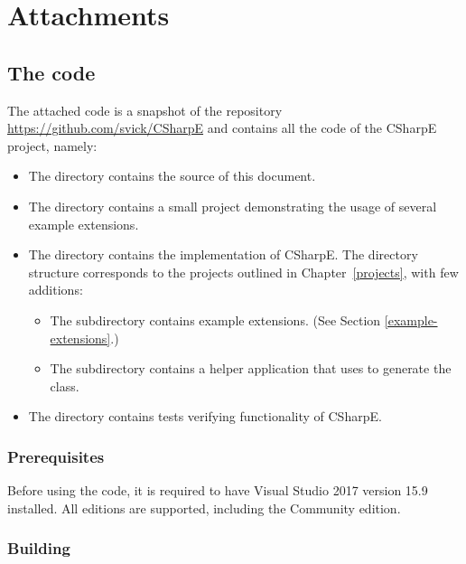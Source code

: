 \chapter{Attachments}

\section{The code}

The attached code is a snapshot of the repository \url{https://github.com/svick/CSharpE} and contains all the code of the CSharpE project, namely:

\begin{itemize}
\item The  directory contains the source of this document.

\item The  directory contains a small project demonstrating the usage of several example extensions.

\item The  directory contains the implementation of CSharpE. The directory structure corresponds to the projects outlined in Chapter~\ref{projects}, with few additions:

\begin{itemize}
\item The  subdirectory contains example extensions. (See Section \ref{example-extensions}.)

\item The  subdirectory contains a helper application that uses  to generate the  class.
\end{itemize}

\item The  directory contains tests verifying functionality of CSharpE.

\end{itemize}

\subsection{Prerequisites}

Before using the code, it is required to have Visual Studio 2017 version 15.9 installed. All editions are supported, including the Community edition.


\subsection{Building}

